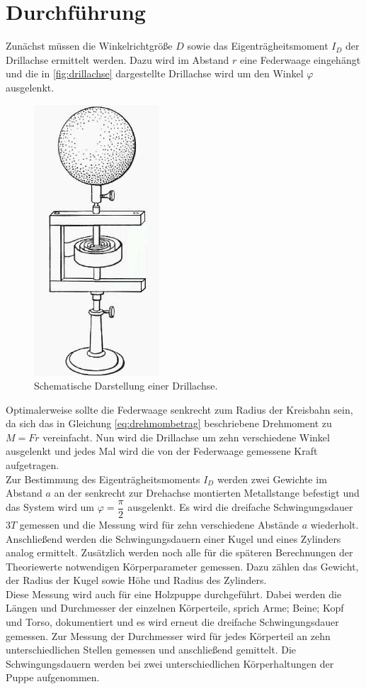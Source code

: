 \section{Durchführung}
\label{sec:Durchführung}
Zunächst müssen die Winkelrichtgröße $D$ sowie das Eigenträgheitsmoment $I_D$ der Drillachse ermittelt werden. Dazu wird im Abstand $r$ eine Federwaage eingehängt 
und die in \autoref{fig:drillachse} dargestellte Drillachse wird um den Winkel $\varphi$ ausgelenkt. 
\begin{figure}[H]
    \centering
    \includegraphics{Drillachse.pdf}
    \caption{Schematische Darstellung einer Drillachse\cite{ap05}.}
    \label{fig:drillachse}
\end{figure}
Optimalerweise sollte die Federwaage senkrecht zum Radius der Kreisbahn sein, da sich das in Gleichung \eqref{eq:drehmombetrag} beschriebene Drehmoment zu $M =F r$ vereinfacht.
Nun wird die Drillachse um zehn verschiedene Winkel ausgelenkt und jedes Mal wird die von der Federwaage gemessene Kraft aufgetragen. \\

Zur Bestimmung des Eigenträgheitsmoments $I_D$ werden zwei Gewichte im Abstand $a$ an der senkrecht zur Drehachse montierten Metallstange befestigt und das System wird um $\varphi = \dfrac{π}{2}$ ausgelenkt.
Es wird die dreifache Schwingungsdauer $3T$ gemessen und die Messung wird für zehn verschiedene Abstände $a$ wiederholt. \\

Anschließend werden die Schwingungsdauern einer Kugel und eines Zylinders analog ermittelt. Zusätzlich werden noch alle für die späteren Berechnungen der Theoriewerte notwendigen Körperparameter gemessen.
Dazu zählen das Gewicht, der Radius der Kugel sowie Höhe und Radius des Zylinders. \\

Diese Messung wird auch für eine Holzpuppe durchgeführt. Dabei werden die Längen und Durchmesser der einzelnen Körperteile, sprich Arme; Beine; Kopf und Torso, dokumentiert und es wird erneut die dreifache Schwingungsdauer
gemessen. Zur Messung der Durchmesser wird für jedes Körperteil an zehn unterschiedlichen Stellen gemessen und anschließend gemittelt. Die Schwingungsdauern werden bei zwei unterschiedlichen Körperhaltungen der Puppe aufgenommen.
